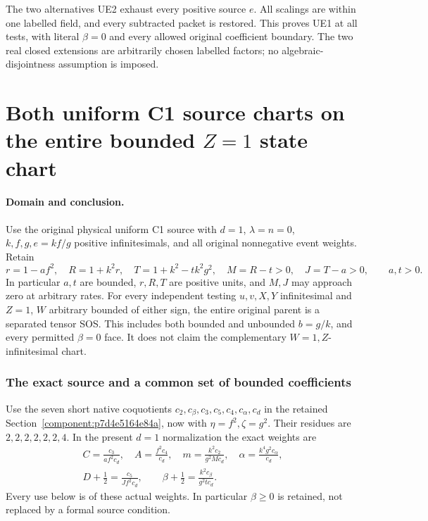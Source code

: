 The two alternatives UE2 exhaust every positive source \(e\).
All scalings are within one labelled field, and every subtracted
packet is restored.  This proves UE1 at all tests, with literal
\(\beta=0\) and every allowed original coefficient boundary.
The two real closed extensions are arbitrarily chosen labelled
factors; no algebraic-disjointness assumption is imposed.



\section{\texorpdfstring{Both uniform C1 source charts on the entire bounded \(Z=1\) state chart}{Both uniform C1 source charts on the entire bounded Z=1 state chart}}
\label{component:pa4f6d1e57f34}

\label{pa4f6d1e57f34:sec:uniform-c1-z-new}

\paragraph{Domain and conclusion.}
Use the original physical uniform C1 source with $d=1$,
$\lambda=n=0$, $k,f,g,e=kf/g$ positive infinitesimals, and
all original nonnegative event weights. Retain
\[
 r=1-af^2,\quad R=1+k^2r,\quad
 T=1+k^2-tk^2g^2,\quad M=R-t>0,\quad J=T-a>0,
 \qquad a,t>0.                                                   \tag{EZ1}
\]
In particular $a,t$ are bounded, $r,R,T$ are positive units,
and $M,J$ may approach zero at arbitrary rates.
For every independent testing $u,v,X,Y$ infinitesimal and
$Z=1$, $W$ arbitrary bounded of either sign, the entire original
parent is a separated tensor SOS. This includes both bounded
and unbounded $b=g/k$, and every permitted $\beta=0$ face.
It does not claim the complementary $W=1,Z$-infinitesimal chart.

\subsubsection*{The exact source and a common set of bounded coefficients}

Use the seven short native coquotients
$c_2,c_\beta,c_3,c_5,c_4,c_\alpha,c_d$ in the retained
Section~\ref{component:p7d4e5164e84a}, now with $\eta=f^2,\zeta=g^2$.
Their residues are $2,2,2,2,2,2,4$.
In the present $d=1$ normalization the exact weights are
\[
\begin{gathered}
 C=\frac{c_3}{af^2c_d},\quad A=\frac{f^2c_4}{c_d},\quad
 m=\frac{k^2c_2}{g^2Mc_d},\quad
 \alpha=\frac{k^4g^2c_\alpha}{c_d},\\
 D+\tfrac12=\frac{c_5}{Jf^2c_d},\qquad
 \beta+\tfrac12=\frac{k^2c_\beta}{g^2tc_d}.
\end{gathered}                                                   \tag{EZ2}
\]
Every use below is of these actual weights. In particular
$\beta\geq0$ is retained, not replaced by a formal source condition.

